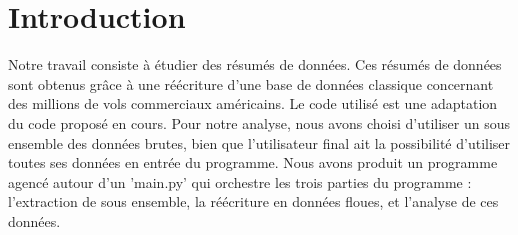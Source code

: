 \section{Introduction}
  Notre travail consiste à étudier des résumés de données.
  Ces résumés de données sont obtenus grâce à une réécriture d'une base de données classique concernant des millions de vols commerciaux américains.
  Le code utilisé est une adaptation du code proposé en cours.
  Pour notre analyse, nous avons choisi d'utiliser un sous ensemble des données brutes, bien que l'utilisateur final ait la possibilité d'utiliser toutes ses données en entrée du programme.
  Nous avons produit un programme agencé autour d'un 'main.py' qui orchestre les trois parties du programme : l'extraction de sous ensemble, la réécriture en données floues, et l'analyse de ces données.
